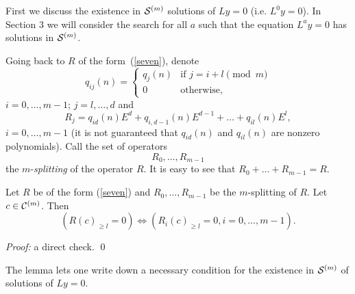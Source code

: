 {}First we discuss the existence in ${\cal S}^{(m)}$
solutions of $Ly=0$
(i.e. $L^0y=0$). In Section 3 we will consider the search for all $a$
such that the equation $L^ay=0$ has solutions in ${\cal S}^{(m)}$.
%

Going back to $R$ of the form~(\ref{seven}), denote
$$
q_{ij}(n) = \left\{
           \begin{array}{ll}
                   q_{j}(n) & \mbox{if } j = i+l \pmod{m}\\
                   0        & \mbox{otherwise},
           \end{array}
              \right.
$$
$i=0,\dots,m-1$; $j=l,\dots,d$ and
$$
R_j = q_{id}(n)E^d+q_{i,d-1}(n)E^{d-1}+\dots+q_{il}(n)E^l,
$$
$i=0,\dots,m-1$ (it is not guaranteed that $q_{id}(n)$ and
$q_{il}(n)$ are nonzero polynomials). Call the set of operators
$$
R_0,\dots,R_{m-1}
$$
the $m$-{\em splitting} of the operator $R$. It is easy to see that
$R_0+\dots+R_{m-1}=R$.

\begin{Lemma}
\label{mspl}
Let $R$ be of the form (\ref{seven}) and
$R_0,...,R_{m-1}$ be the $m$-splitting of $R$. Let
$c\in {\cal C}^{(m)}$. Then
\begin{equation}
\label{13}
(R(c)_{\geq l}=0) \Leftrightarrow (R_i(c)_{\geq l}=0, i=0,\dots,m-1).
\end{equation}
\end{Lemma}
{\em Proof:\/}
a direct check. \qed

The lemma lets one write down a necessary condition for the existence
in ${\cal S}^{(m)}$ of solutions of $Ly=0$.

